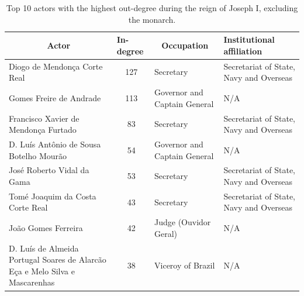 \documentclass{article}
\begin{document}
\begin{table}[]
	\vspace{0.2cm}
	\centering
	\caption{Top 10 actors with the highest out-degree during the reign of Joseph I, excluding the monarch. \label{tb:out_joseph}}
	\vspace{0.2cm}
	\begin{tabular}{|p{4cm}|c|p{4cm}|p{4cm}|}
		\hline
		\multicolumn{1}{|c|}{Actor}                                                  & \multicolumn{1}{l|}{In-degree} & \multicolumn{1}{c|}{Occupation}                   & \multicolumn{1}{l|}{Institutional affiliation} \\ \hline
		Diogo de Mendonça Corte Real                                                 & 127                            & Secretary                                         & Secretariat of State, Navy and Overseas        \\ \hline
		Gomes Freire de Andrade                                                      & 113                            & Governor and Captain General                      & N/A                                            \\ \hline
		Francisco Xavier de Mendonça Furtado                                         & 83                             & Secretary                                         & Secretariat of State, Navy and Overseas        \\ \hline
		D. Luís Antônio de Sousa Botelho Mourão                                      & 54                             & Governor and Captain General                      & N/A                                            \\ \hline
		José Roberto Vidal da Gama                                                   & 53                             & Secretary                                         & Secretariat of State, Navy and Overseas        \\ \hline
		Tomé Joaquim da Costa Corte Real                                             & 43                             & Secretary                                         & Secretariat of State, Navy and Overseas        \\ \hline
		João Gomes Ferreira                                                          & 42                             & Judge (Ouvidor Geral)                             & N/A                                            \\ \hline
		D. Luís de Almeida Portugal Soares de Alarcão Eça e Melo Silva e Mascarenhas & 38                             & \multicolumn{1}{l|}{Viceroy of Brazil}            & N/A                                            \\ \hline

\end{tabular}
\end{table}
\end{document}
